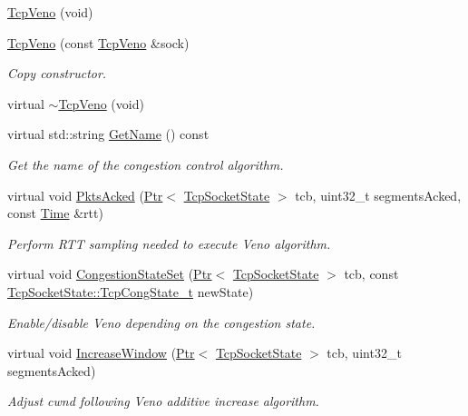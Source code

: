 \begin{DoxyCompactItemize}
\item 
\hyperlink{classns3_1_1TcpVeno_a6a4a54e29b00f88169572c5b710f9c31}{Tcp\+Veno} (void)
\item 
\hyperlink{classns3_1_1TcpVeno_a2116c900f21fd917acd8f3fcb3dcc318}{Tcp\+Veno} (const \hyperlink{classns3_1_1TcpVeno}{Tcp\+Veno} \&sock)
\begin{DoxyCompactList}\small\item\em Copy constructor. \end{DoxyCompactList}\item 
virtual \hyperlink{classns3_1_1TcpVeno_aec966ca40fa5ebb773fec6ae609efca0}{$\sim$\+Tcp\+Veno} (void)
\item 
virtual std\+::string \hyperlink{classns3_1_1TcpVeno_a53f0c8ff201ea8972166ae6cca450d07}{Get\+Name} () const 
\begin{DoxyCompactList}\small\item\em Get the name of the congestion control algorithm. \end{DoxyCompactList}\item 
virtual void \hyperlink{classns3_1_1TcpVeno_a8270456c1a00231bd8c2282da8b99561}{Pkts\+Acked} (\hyperlink{classns3_1_1Ptr}{Ptr}$<$ \hyperlink{classns3_1_1TcpSocketState}{Tcp\+Socket\+State} $>$ tcb, uint32\+\_\+t segments\+Acked, const \hyperlink{classns3_1_1Time}{Time} \&rtt)
\begin{DoxyCompactList}\small\item\em Perform R\+TT sampling needed to execute Veno algorithm. \end{DoxyCompactList}\item 
virtual void \hyperlink{classns3_1_1TcpVeno_a39f34ca48e88063934c9c4f893d9c1dc}{Congestion\+State\+Set} (\hyperlink{classns3_1_1Ptr}{Ptr}$<$ \hyperlink{classns3_1_1TcpSocketState}{Tcp\+Socket\+State} $>$ tcb, const \hyperlink{classns3_1_1TcpSocketState_a6fc313945a33d48fd60cbffe0c787b19}{Tcp\+Socket\+State\+::\+Tcp\+Cong\+State\+\_\+t} new\+State)
\begin{DoxyCompactList}\small\item\em Enable/disable Veno depending on the congestion state. \end{DoxyCompactList}\item 
virtual void \hyperlink{classns3_1_1TcpVeno_a5865787a20ea7c2c8beee2df5cefcdaa}{Increase\+Window} (\hyperlink{classns3_1_1Ptr}{Ptr}$<$ \hyperlink{classns3_1_1TcpSocketState}{Tcp\+Socket\+State} $>$ tcb, uint32\+\_\+t segments\+Acked)
\begin{DoxyCompactList}\small\item\em Adjust cwnd following Veno additive increase algorithm. \end{DoxyCompactList}\item 

\end{DoxyCompactItemize}
